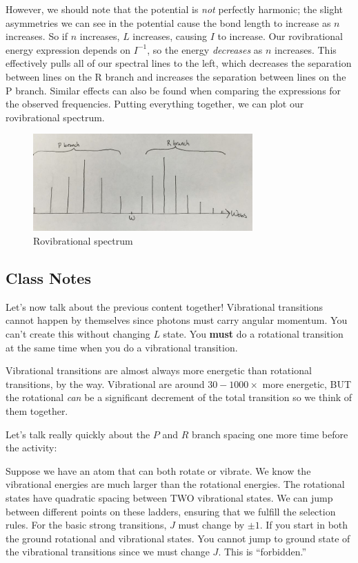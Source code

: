 \documentclass{article}
\begin{document}
However, we should note that the potential is {\it not} perfectly harmonic; the slight asymmetries we can see in the potential cause the bond length to increase as $n$ increases. So if $n$ increases, $L$ increases, causing $I$ to increase. Our rovibrational energy expression depends on $I^{-1}$, so the energy {\it decreases} as $n$ increases. This effectively pulls all of our spectral lines to the left, which decreases the separation between lines on the R branch and increases the separation between lines on the P branch. Similar effects can also be found when comparing the expressions for the observed frequencies. Putting everything together, we can plot our rovibrational spectrum.

\begin{figure}[ht]
    \centering
    \includegraphics[width=0.75\textwidth]{800px-Spectrum.jpg}
    \caption{Rovibrational spectrum}
    \label{fig:rovooooospec}
\end{figure}


\subsection{Class Notes}

Let's now talk about the previous content together! Vibrational transitions cannot happen by themselves since photons must carry angular momentum. You can't create this without changing $L$ state. You \textbf{must} do a rotational transition at the same time when you do a vibrational transition. 

Vibrational transitions are almost always more energetic than rotational transitions, by the way. Vibrational are around $30-1000\times$ more energetic, BUT the rotational \textit{can} be a significant decrement of the total transition  so we think of them together. 

Let's talk really quickly about the $P$ and $R$ branch spacing one more time before the activity:

Suppose we have an atom that can both rotate or vibrate. We know the vibrational energies are much larger than the rotational energies. The rotational states have quadratic spacing between TWO vibrational states. We can jump between different points on these ladders, ensuring that we fulfill the selection rules. For the basic strong transitions, $J$ must change by $\pm 1$. If you start in both the ground rotational and vibrational states. You cannot jump to ground state of the vibrational transitions since we must change $J$. This is ``forbidden.'' 
\end{document}
